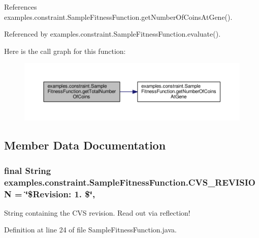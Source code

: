 References examples.\-constraint.\-Sample\-Fitness\-Function.\-get\-Number\-Of\-Coins\-At\-Gene().



Referenced by examples.\-constraint.\-Sample\-Fitness\-Function.\-evaluate().



Here is the call graph for this function\-:
\nopagebreak
\begin{figure}[H]
\begin{center}
\leavevmode
\includegraphics[width=350pt]{classexamples_1_1constraint_1_1_sample_fitness_function_a0bdac2f6a4540b206a09e067a63df40c_cgraph}
\end{center}
\end{figure}




\subsection{Member Data Documentation}
\hypertarget{classexamples_1_1constraint_1_1_sample_fitness_function_a99b3aa634b12738e448c5a1e1ad740e6}{
\subsubsection[{C\-V\-S\-\_\-\-R\-E\-V\-I\-S\-I\-O\-N}]{\setlength{\rightskip}{0pt plus 5cm}final String examples.\-constraint.\-Sample\-Fitness\-Function.\-C\-V\-S\-\_\-\-R\-E\-V\-I\-S\-I\-O\-N = \char`\"{}\$Revision\-: 1. \$\char`\"{}\hspace{0.3cm}{\ttfamily [static]}, {\ttfamily [private]}}}\label{classexamples_1_1constraint_1_1_sample_fitness_function_a99b3aa634b12738e448c5a1e1ad740e6}
String containing the C\-V\-S revision. Read out via reflection! 

Definition at line 24 of file Sample\-Fitness\-Function.\-java.

